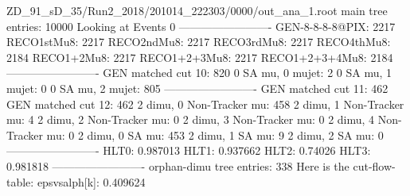 ZD_91_sD_35/Run2_2018/201014_222303/0000/out_ana_1.root
main tree entries: 10000
Looking at Events 0
-------------------------
GEN-8-8-8-8@PIX: 2217
RECO1stMu8: 2217
RECO2ndMu8: 2217
RECO3rdMu8: 2217
RECO4thMu8: 2184
RECO1+2Mu8: 2217
RECO1+2+3Mu8: 2217
RECO1+2+3+4Mu8: 2184
-------------------------
GEN matched cut 10: 820
0 SA mu, 0 mujet: 2
0 SA mu, 1 mujet: 0
0 SA mu, 2 mujet: 805
-------------------------
GEN matched cut 11: 462
GEN matched cut 12: 462
2 dimu, 0 Non-Tracker mu: 458
2 dimu, 1 Non-Tracker mu: 4
2 dimu, 2 Non-Tracker mu: 0
2 dimu, 3 Non-Tracker mu: 0
2 dimu, 4 Non-Tracker mu: 0
2 dimu, 0 SA mu: 453
2 dimu, 1 SA mu: 9
2 dimu, 2 SA mu: 0
-------------------------
HLT0: 0.987013
HLT1: 0.937662
HLT2: 0.74026
HLT3: 0.981818
-------------------------
orphan-dimu tree entries: 338
Here is the cut-flow-table:
epsvsalph[k]: 0.409624
        
